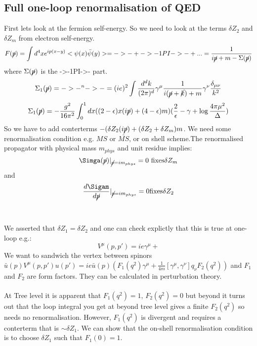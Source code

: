 \documentclass{article}
\begin{document}
 \subsection{Full one-loop renormalisation of QED}
 First lets look at the fermion self-energy. So we need to look at the terms $\delta Z_2$ and $\delta Z_m$ from electron self-energy.
 $$
  F( \cancel p) = \int d^4 x e^{i p(x-y)} < \psi(x) \bar \psi(y)> = ->- + ->-1PI->- +... = \frac{1}{i \cancel p + m - \Sigma (\cancel p)}
 $$
 where $\Sigma( \cancel p)$ is the ->-1PI->- part. 
 $$
 \Sigma_1(\cancel p) = ->-^n->- = (ie)^2 \int \frac{d^d k}{(2 \pi)^d} \gamma^{\mu} \frac{1}{i (\cancel p + \cancel k) + m} \gamma^{\nu} \frac{\delta_{\mu \nu}}{k^2}
 $$
 $$
 \Sigma_1(\cancel p) = - \frac{g^2}{16 \pi^2} \int^1_0 dx ( (2- \epsilon) x (i \cancel p) + (4- \epsilon)m)( \frac{2}{\epsilon} - \gamma + \log \frac{4 \pi \mu^2}{\Delta})
 $$
 So we have to add conterterms $-( \delta Z_2(i \cancel p) + (\delta Z_2 + \delta Z_m)m$. We need some renormalisation condition e.g. $MS$ or $\bar{MS}$, or on shell scheme.The renormalised propagator with physical mass $m_{phys}$ and unit residue implies:
 $$
  \Simga(\cancel p) |_{\cancel p = i m_{phys}} = 0 \text{ fixes} \delta Z_m
 $$
 and
 $$
  \frac{ d \Sigam}{d \cancel p} |_{\cancel p = i m_{phys}} = 0 \text{fixes} \delta Z_2
 $$\\\\
 We asserted that $\delta Z_1 = \delta Z_2$ and one can check explictly that this is true at one-loop e.g.:
 $$
  V^{\mu} ( p,p') = ie \gamma^{\mu} + 
 $$
 We want to sandwich the vertex between spinors $\bar u(p) V^{\mu} ( p, p') u( p') = i e \bar u(p) ( F_1(q^2)\gamma^{\mu} + \frac{1}{4m} [ \gamma^{\mu}, \gamma^{\nu}] q_{\nu} F_2(q^2))$ and $F_1$ and $F_2$ are form factors. They can be calculated in perturbation theory. \\\\
         At Tree level it is apparent that $F_1(q^2) = 1$, $F_2(q^2) = 0$ but beyond it turns out that the loop integral you get at beyond tree level gives a finite $F_2(q^2)$ so needs no renormalisation. However, $F_1(q^2)$ is divergent and requires a conterterm that is $\sim \delta Z_1$. We can show that the on-shell renormalisation condition is to choose $\delta Z_1$ such that $F_1(0) = 1$.
\end{document}
